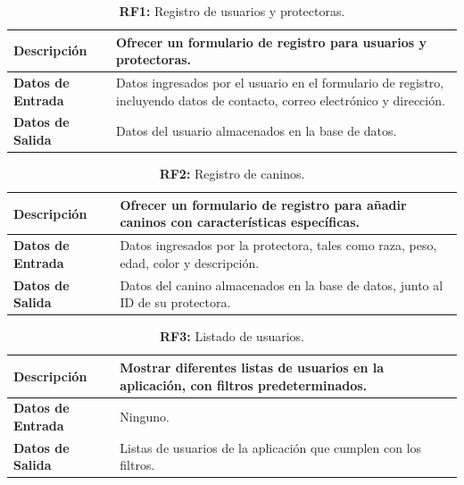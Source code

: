 \documentclass[a4paper, 12pt]{article}
\begin{document}
\begin{table}[H]
\captionsetup{list=no}%
\captionsetup{justification=raggedright,singlelinecheck=false}
\captionsetup{labelformat=empty}
\caption{\textbf{RF1:} Registro de usuarios y protectoras.}
\label{tab:RF1}
	\begin{tabular}{|m{5cm}|m{10cm}|}
	\hline
	\textbf{Descripción} & Ofrecer un formulario de registro para usuarios y protectoras. \\ 
	\hline
	\textbf{Datos de Entrada} & Datos ingresados por el usuario en el formulario de registro, incluyendo datos de contacto, correo electrónico y dirección. \\ 
	\hline
	\textbf{Datos de Salida} & Datos del usuario almacenados en la base de datos. \\ 
	\hline
\end{tabular}
\end{table}

\begin{table}[H]
\captionsetup{list=no}%
\captionsetup{justification=raggedright,singlelinecheck=false}
\captionsetup{labelformat=empty}
\caption{\textbf{RF2:} Registro de caninos.}
\label{tab:RF2}
	\begin{tabular}{|m{5cm}|m{10cm}|}
	\hline
	\textbf{Descripción} & Ofrecer un formulario de registro para añadir caninos con características específicas. \\ 
	\hline
	\textbf{Datos de Entrada} & Datos ingresados por la protectora, tales como raza, peso, edad, color y descripción. \\ 
	\hline
	\textbf{Datos de Salida} & Datos del canino almacenados en la base de datos, junto al ID de su protectora. \\ 
	\hline
\end{tabular}
\end{table}

\begin{table}[H]
\captionsetup{list=no}%
\captionsetup{justification=raggedright,singlelinecheck=false}
\captionsetup{labelformat=empty}
\caption{\textbf{RF3:} Listado de usuarios.}
\label{tab:RF23}
	\begin{tabular}{|m{5cm}|m{10cm}|}
	\hline
	\textbf{Descripción} & Mostrar diferentes listas de usuarios en la aplicación, con filtros predeterminados. \\ 
	\hline
	\textbf{Datos de Entrada} & Ninguno. \\ 
	\hline
	\textbf{Datos de Salida} & Listas de usuarios de la aplicación que cumplen con los filtros.  \\ 
	\hline
\end{tabular}
\end{table}
\end{document}
